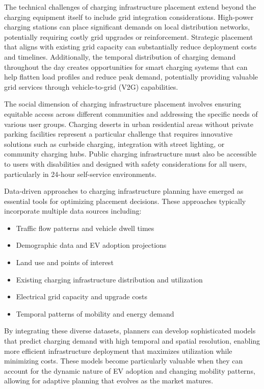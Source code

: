 The technical challenges of charging infrastructure placement extend beyond the charging equipment itself to include grid integration considerations. High-power charging stations can place significant demands on local distribution networks, potentially requiring costly grid upgrades or reinforcement. Strategic placement that aligns with existing grid capacity can substantially reduce deployment costs and timelines. Additionally, the temporal distribution of charging demand throughout the day creates opportunities for smart charging systems that can help flatten load profiles and reduce peak demand, potentially providing valuable grid services through vehicle-to-grid (V2G) capabilities.

The social dimension of charging infrastructure placement involves ensuring equitable access across different communities and addressing the specific needs of various user groups. Charging deserts in urban residential areas without private parking facilities represent a particular challenge that requires innovative solutions such as curbside charging, integration with street lighting, or community charging hubs. Public charging infrastructure must also be accessible to users with disabilities and designed with safety considerations for all users, particularly in 24-hour self-service environments.

Data-driven approaches to charging infrastructure planning have emerged as essential tools for optimizing placement decisions. These approaches typically incorporate multiple data sources including:

\begin{itemize}
    \item Traffic flow patterns and vehicle dwell times
    \item Demographic data and EV adoption projections
    \item Land use and points of interest
    \item Existing charging infrastructure distribution and utilization
    \item Electrical grid capacity and upgrade costs
    \item Temporal patterns of mobility and energy demand
\end{itemize}

By integrating these diverse datasets, planners can develop sophisticated models that predict charging demand with high temporal and spatial resolution, enabling more efficient infrastructure deployment that maximizes utilization while minimizing costs. These models become particularly valuable when they can account for the dynamic nature of EV adoption and changing mobility patterns, allowing for adaptive planning that evolves as the market matures.

